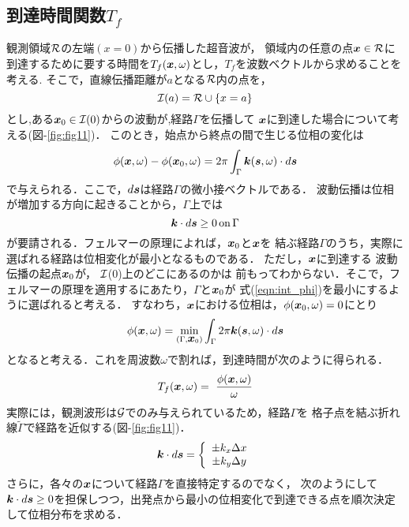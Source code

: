 \subsection{到達時間関数$T_f$}
観測領域${\cal R}$の左端$(x=0)$から伝播した超音波が，
領域内の任意の点$\fat{x}\in {\cal R}$に
到達するために要する時間を$T_f(\mbox{\boldmath{$x$}},\omega)$とし，$T_f$を波数ベクトルから求めることを考える.
そこで，直線伝播距離が$a$となる$\cal R$内の点を，
\begin{equation}
	{\cal I}(a)={\cal R} \cup \left\{ x=a\right\}
	\label{eqn:def_I0}
\end{equation}
とし,ある$\fat{x}_0\in {\cal I}(0)$からの波動が,経路$\Gamma$を伝播して
$\mbox{\boldmath{$x$}}$に到達した場合について考える(図-\ref{fig:fig11})．
このとき，始点から終点の間で生じる位相の変化は
\begin{equation}
	\phi(\fat{x},\omega)-\phi(\fat{x}_0,\omega)=
	2\pi \int_{\Gamma} \fat{k}(\fat{s},\omega)\cdot d\fat{s}
	\label{eqn:int_phi}
\end{equation}
で与えられる．ここで，$d\mbox{\boldmath{$s$}}$は経路$\Gamma$の微小接ベクトルである．
波動伝播は位相が増加する方向に起きることから，$\Gamma$上では
\begin{equation}
	\fat{k}\cdot d\fat{s}\geq 0 \, {\rm on} \, \Gamma 
	\label{eqn:}
\end{equation}
が要請される．フェルマーの原理によれば，$\mbox{\boldmath{$x$}}_0$と$\mbox{\boldmath{$x$}}$を
結ぶ経路$\Gamma$のうち，実際に選ばれる経路は位相変化が最小となるものである．
ただし，$\mbox{\boldmath{$x$}}$に到達する 波動伝播の起点$\mbox{\boldmath{$x$}}_0$が， $\cal I$(0)上のどこにあるのかは
前もってわからない．そこで，フェルマーの原理を適用するにあたり，$\Gamma$と$\mbox{\boldmath{$x$}}_0$が
式(\ref{eqn:int_phi})を最小にするように選ばれると考える．
すなわち，$\mbox{\boldmath{$x$}}$における位相は，$\phi(\mbox{\boldmath{$x$}}_0,\omega)=0$にとり
\begin{equation}
	\phi(\fat{x},\omega) 
	=
	\min_{\left(\Gamma, \fat{x}_0\right)}
	\int_\Gamma 2\pi \fat{k}(\fat{s},\omega) \cdot d\fat{s}
	\label{eqn:Fermat}
\end{equation}
となると考える．これを周波数$\omega$で割れば，到達時間が次のように得られる．
\begin{equation}
	T_f(\fat{x},\omega) = \
	\frac{\phi(\fat{x},\omega)}{\omega}
	\label{eqn:def_Tf}
\end{equation}
実際には，観測波形は${\cal G}$でのみ与えられているため，経路$\Gamma$を
格子点を結ぶ折れ線$\tilde \Gamma$で経路を近似する(図-\ref{fig:fig11})．
\begin{equation}
	\fat{k}\cdot d\fat{s}
	=
	\left\{
	\begin{array}{c}
		\pm k_x \Delta x \\
		\pm k_y \Delta y
	\end{array}
	\right.
	\label{eqn:}
\end{equation}
さらに，各々の$\mbox{\boldmath{$x$}}$について経路$\Gamma$を直接特定するのでなく，
次のようにして$\mbox{\boldmath{$k$}}\cdot d\mbox{\boldmath{$s$}}\ge 0$を担保しつつ，出発点から最小の位相変化で到達できる点を順次決定して位相分布を求める．
